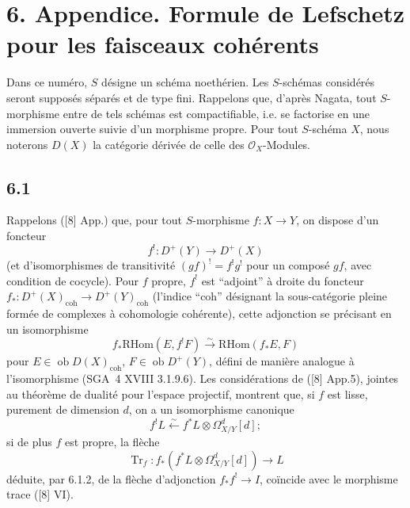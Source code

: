 \documentclass[11pt]{article}
\providecommand{\cO}{\mathcal{O}}
\providecommand{\RHom}{\mathrm{RHom}}
\providecommand{\RHom}{\mathrm{RHom}}
\providecommand{\RHom}{\mathrm R\mathcal{H}om}
\providecommand{\RHom}{\mathrm{RHom}}
\begin{document}
\section*{6. Appendice. Formule de Lefschetz pour les faisceaux cohérents}

Dans ce numéro, $S$ désigne un schéma noethérien. Les $S$-schémas considérés seront supposés séparés et de type fini. Rappelons que, d'après Nagata, tout $S$-morphisme entre de tels schémas est compactifiable, i.e. se factorise en une immersion ouverte suivie d'un morphisme propre. Pour tout $S$-schéma $X$, nous noterons $D(X)$ la catégorie dérivée de celle des $\cO_X$-Modules.

\subsection*{6.1}
Rappelons ([8] App.) que, pour tout $S$-morphisme $f:X\to Y$, on dispose d'un foncteur
\[
f^!:D^+(Y)\longrightarrow D^+(X)
\]
(et d'isomorphismes de transitivité $(gf)^! = f^!g^!$ pour un composé $gf$, avec condition de cocycle). Pour $f$ propre, $f^!$ est ``adjoint'' à droite du foncteur $f_*:D^+(X)_{\mathrm{coh}}\to D^+(Y)_{\mathrm{coh}}$ (l'indice ``coh'' désignant la sous-catégorie pleine formée de complexes à cohomologie cohérente), cette adjonction se précisant en un isomorphisme
\begin{equation}
\tag{6.1.1}
f_*\RHom(E,f^!F)\xrightarrow{\sim}\RHom(f_*E,F)
\end{equation}
pour $E\in\operatorname{ob}D(X)_{\mathrm{coh}}$, $F\in\operatorname{ob}D^+(Y)$, défini de manière analogue à l'isomorphisme (SGA~4 XVIII 3.1.9.6). Les considérations de ([8] App.5), jointes au théorème de dualité pour l'espace projectif, montrent que, si $f$ est lisse, purement de dimension $d$, on a un isomorphisme canonique
\begin{equation}
\tag{6.1.2}
f^!L\xleftarrow{\sim} f^*L\otimes\Omega^d_{X/Y}[d];
\end{equation}
si de plus $f$ est propre, la flèche
\begin{equation}
\tag{6.1.3}
\operatorname{Tr}_f:f_*(f^*L\otimes\Omega^d_{X/Y}[d])\longrightarrow L
\end{equation}
déduite, par 6.1.2, de la flèche d'adjonction $f_*f^!\to I$, coïncide avec le morphisme trace ([8] VI).
\end{document}
